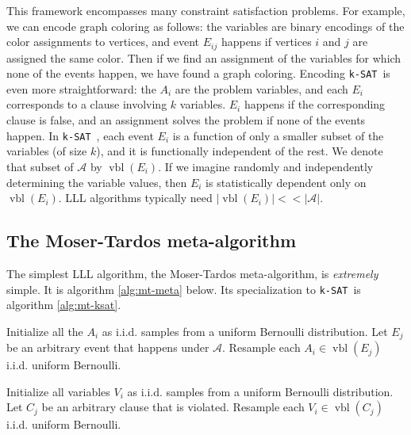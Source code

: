 \documentclass[twocolumn]{article}
\newcommand{\ksat}{\texttt{k-SAT}~}
\begin{document}
This framework encompasses many constraint satisfaction problems.  For example, we can encode graph coloring as follows: the variables are binary encodings of the color assignments to vertices, and event $E_{ij}$ happens if vertices $i$ and $j$ are assigned the same color.  Then if we find an assignment of the variables for which none of the events happen, we have found a graph coloring.  Encoding \ksat is even more straightforward: the $A_i$ are the problem variables, and each $E_i$ corresponds to a clause involving $k$ variables.  $E_i$ happens if the corresponding clause is false, and an assignment solves the problem if none of the events happen.  In \ksat, each event $E_i$ is a function of only a smaller subset of the variables (of size $k$), and it is functionally independent of the rest.  We denote that subset of $\mathcal{A}$ by $\operatorname{vbl}(E_i)$.  If we imagine randomly and independently determining the variable values, then $E_i$ is statistically dependent only on $\operatorname{vbl}(E_i)$.  LLL algorithms typically need $|\operatorname{vbl}(E_i)| << |\mathcal{A}|$.

\subsection{The Moser-Tardos meta-algorithm}
The simplest LLL algorithm, the Moser-Tardos meta-algorithm, is \emph{extremely} simple.  It is algorithm \ref{alg:mt-meta} below.  Its specialization to \ksat is algorithm \ref{alg:mt-ksat}.

\begin{algorithm}[H]
\label{alg:mt-meta}
\begin{algorithmic}
\State Initialize all the $A_i$ as i.i.d. samples from a uniform Bernoulli distribution.
  \State Let $E_j$ be an arbitrary event that happens under $\mathcal{A}$.
  \State Resample each $A_i \in \operatorname{vbl}(E_j)$ i.i.d. uniform Bernoulli.
\EndWhile
\end{algorithmic}
\caption{The Moser-Tardos meta-algorithm.}
\end{algorithm}

\begin{algorithm}[H]
\label{alg:mt-ksat}
\begin{algorithmic}
\State Initialize all variables $V_i$ as i.i.d. samples from a uniform Bernoulli distribution.
  \State Let $C_j$ be an arbitrary clause that is violated.
  \State Resample each $V_i \in \operatorname{vbl}(C_j)$ i.i.d. uniform Bernoulli.
\EndWhile
\end{algorithmic}
\caption{The Moser-Tardos meta-algorithm, specialized to \ksat.}
\end{algorithm}
\end{document}
